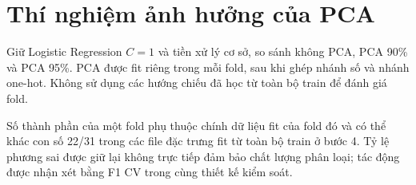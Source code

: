 \section{Thí nghiệm ảnh hưởng của PCA}
\label{sec:5_6}
Giữ Logistic Regression $C=1$ và tiền xử lý cơ sở, so sánh không PCA, PCA 90\% và PCA 95\%. PCA được fit riêng trong mỗi fold, sau khi ghép nhánh số và nhánh one-hot. Không sử dụng các hướng chiếu đã học từ toàn bộ train để đánh giá fold.

Số thành phần của một fold phụ thuộc chính dữ liệu fit của fold đó và có thể khác con số 22/31 trong các file đặc trưng fit từ toàn bộ train ở bước 4. Tỷ lệ phương sai được giữ lại không trực tiếp đảm bảo chất lượng phân loại; tác động được nhận xét bằng F1 CV trong cùng thiết kế kiểm soát.
